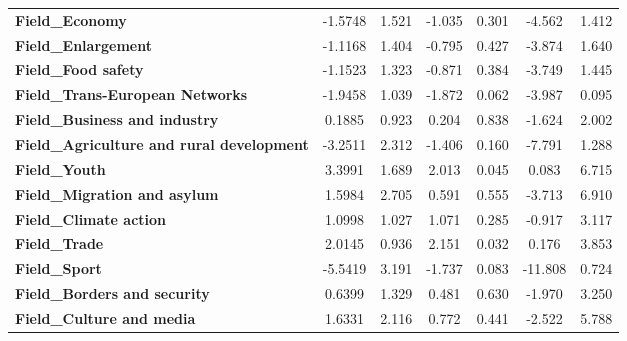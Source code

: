 \documentclass[ 11pt]{article}
\begin{document}
\begin{center}
\begin{longtable}{lcccccc}
\textbf{Field\_Economy}                                    &      -1.5748  &        1.521     &    -1.035  &         0.301        &       -4.562    &        1.412     \\
\textbf{Field\_Enlargement}                                &      -1.1168  &        1.404     &    -0.795  &         0.427        &       -3.874    &        1.640     \\
\textbf{Field\_Food safety}                                &      -1.1523  &        1.323     &    -0.871  &         0.384        &       -3.749    &        1.445     \\
\textbf{Field\_Trans-European Networks}                    &      -1.9458  &        1.039     &    -1.872  &         0.062        &       -3.987    &        0.095     \\
\textbf{Field\_Business and industry}                      &       0.1885  &        0.923     &     0.204  &         0.838        &       -1.624    &        2.002     \\
\textbf{Field\_Agriculture and rural development}          &      -3.2511  &        2.312     &    -1.406  &         0.160        &       -7.791    &        1.288     \\
\textbf{Field\_Youth}                                      &       3.3991  &        1.689     &     2.013  &         0.045        &        0.083    &        6.715     \\
\textbf{Field\_Migration and asylum}                       &       1.5984  &        2.705     &     0.591  &         0.555        &       -3.713    &        6.910     \\
\textbf{Field\_Climate action}                             &       1.0998  &        1.027     &     1.071  &         0.285        &       -0.917    &        3.117     \\
\textbf{Field\_Trade}                                      &       2.0145  &        0.936     &     2.151  &         0.032        &        0.176    &        3.853     \\
\textbf{Field\_Sport}                                      &      -5.5419  &        3.191     &    -1.737  &         0.083        &      -11.808    &        0.724     \\
\textbf{Field\_Borders and security}                       &       0.6399  &        1.329     &     0.481  &         0.630        &       -1.970    &        3.250     \\
\textbf{Field\_Culture and media}                          &       1.6331  &        2.116     &     0.772  &         0.441        &       -2.522    &        5.788     \\

\end{longtable}
\end{center}
\end{document}
